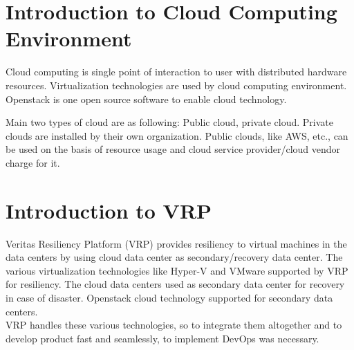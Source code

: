 \documentclass[a4paper,oneside,1,english1pt]{report}
\begin{document}
\section{Introduction to Cloud Computing Environment}
	Cloud computing is single point of interaction to user with distributed hardware resources. Virtualization technologies are used by cloud computing environment.   Openstack is one open source  software to enable cloud technology.
	\par Main two types of cloud are as following: Public cloud, private cloud. Private clouds are installed by their own organization. Public clouds, like AWS, etc., can be used on the basis of resource usage and cloud service provider/cloud vendor charge for it.
	
\section{Introduction to \ac{VRP}}
	Veritas Resiliency Platform (\ac{VRP}) provides resiliency to virtual machines in the data centers by using cloud data center as secondary/recovery data center. The various virtualization technologies like Hyper-V and VMware supported by \ac{VRP} for resiliency.
	The cloud data centers used as secondary data center for recovery in case of disaster. Openstack cloud technology supported for secondary data centers.\\
	VRP handles these various technologies, so to integrate them altogether and to develop product fast and seamlessly, to implement DevOps was necessary.
\end{document}
